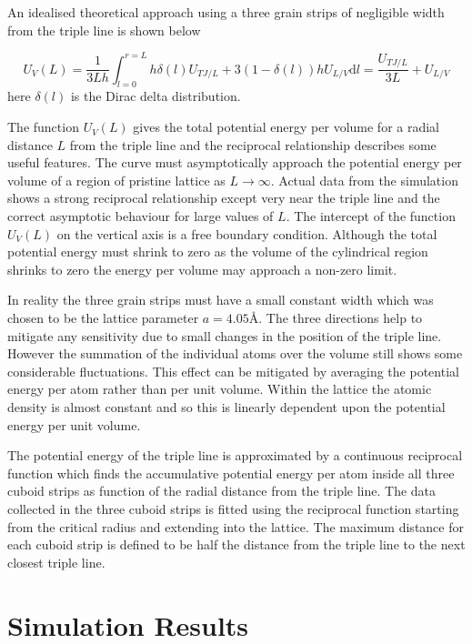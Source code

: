 \documentclass[12pt,a4paper,openany]{report}
\begin{document}
An idealised theoretical approach using a three grain strips of negligible width from the triple line is shown below 

\[ U_V(L) =\frac{1}{3 L h}\int_{l=0}^{r=L} h \delta(l) U_{TJ/L} + 3(1-\delta(l) ) h U_{L/V}  \text{d}l = \frac{U_{TJ/L}}{3L}  + U_{L/V} 
\label{eq:L1}
\]
here $\delta(l)$ is the Dirac delta distribution.

The function $U_V(L)$ gives the total potential energy per volume for a radial distance $L$ from the triple line and the reciprocal relationship describes some useful features. The curve must asymptotically approach the potential energy per volume of a region of pristine lattice as $L \rightarrow \infty$. Actual data from the simulation shows a strong reciprocal relationship except very near the triple line and the correct asymptotic behaviour for large values of $L$. The intercept  of the function $U_V(L)$ on the vertical axis is a free boundary condition. Although the total potential energy must shrink to zero as the volume of the cylindrical region shrinks to zero the energy per volume may approach a non-zero limit.  

In reality the three grain strips must have a small constant width which was chosen to be the lattice parameter $a =4.05 \textrm{\AA}$. The three directions help to mitigate any sensitivity due to small changes in the position of the triple line. However the summation of the individual atoms over the volume still shows some considerable fluctuations. This effect can be mitigated by averaging the potential energy per atom rather than per unit volume. Within the lattice the atomic density is almost constant and so this is linearly dependent upon the potential energy per unit volume.  

The potential energy of the triple line is approximated by a continuous reciprocal function which finds the accumulative potential energy per atom inside all three cuboid strips as function of the radial distance from the triple line. The data collected in the three cuboid strips is fitted using the reciprocal function starting from the critical radius and extending into the lattice. The maximum distance for each cuboid strip is defined to be half the distance from the triple line to the next closest triple line.



\chapter{Simulation Results} \label{ch:SimulationResults}
\end{document}
